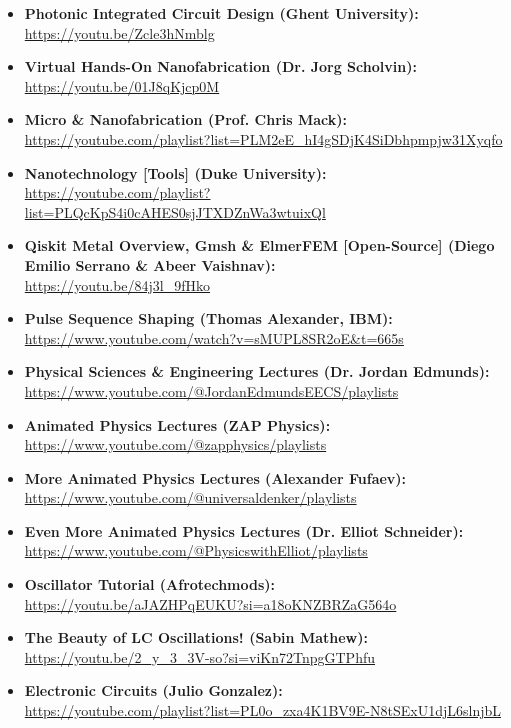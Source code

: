 \begin{itemize}
  \item\textbf{Photonic Integrated Circuit Design (Ghent University):}\\
\url{https://youtu.be/Zcle3hNmblg}

  \item\textbf{Virtual Hands-On Nanofabrication (Dr. Jorg Scholvin):}\\
\url{https://youtu.be/01J8qKjcp0M}

  \item\textbf{Micro \& Nanofabrication (Prof. Chris Mack):}\\
\url{https://youtube.com/playlist?list=PLM2eE_hI4gSDjK4SiDbhpmpjw31Xyqfo}

  \item\textbf{Nanotechnology [Tools] (Duke University):}\\
\url{https://youtube.com/playlist?list=PLQcKpS4i0cAHES0sjJTXDZnWa3wtuixQl}

  \item\textbf{Qiskit Metal Overview, Gmsh \& ElmerFEM [Open-Source] (Diego Emilio Serrano \& Abeer Vaishnav):}\\
\url{https://youtu.be/84j3l_9fHko}

  \item\textbf{Pulse Sequence Shaping (Thomas Alexander, IBM):}\\
\url{https://www.youtube.com/watch?v=sMUPL8SR2oE&t=665s}

  \item\textbf{Physical Sciences \& Engineering Lectures (Dr. Jordan Edmunds):}\\
\url{https://www.youtube.com/@JordanEdmundsEECS/playlists}

  \item\textbf{Animated Physics Lectures (ZAP Physics):}\\
\url{https://www.youtube.com/@zapphysics/playlists}

  \item\textbf{More Animated Physics Lectures (Alexander Fufaev):}\\
\url{https://www.youtube.com/@universaldenker/playlists}

  \item\textbf{Even More Animated Physics Lectures (Dr. Elliot Schneider):}\\
\url{https://www.youtube.com/@PhysicswithElliot/playlists}

\item\textbf{Oscillator Tutorial (Afrotechmods):}\\
\url{https://youtu.be/aJAZHPqEUKU?si=a18oKNZBRZaG564o}

\item\textbf{The Beauty of LC Oscillations! (Sabin Mathew):}\\
\url{https://youtu.be/2_y_3_3V-so?si=viKn72TnpgGTPhfu}

  \item\textbf{Electronic Circuits (Julio Gonzalez):}\\
\url{https://youtube.com/playlist?list=PL0o_zxa4K1BV9E-N8tSExU1djL6slnjbL}

\end{itemize}

